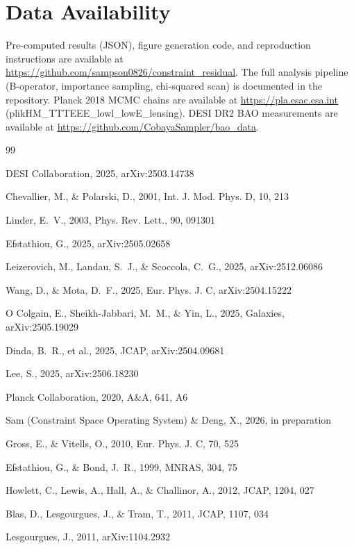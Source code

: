 \documentclass[12pt,preprint]{aastex631}
\begin{document}
\section*{Data Availability}
Pre-computed results (JSON), figure generation code, and reproduction instructions are available at \url{https://github.com/sampson0826/constraint_residual}. The full analysis pipeline (B-operator, importance sampling, chi-squared scan) is documented in the repository. Planck 2018 MCMC chains are available at \url{https://pla.esac.esa.int} (plikHM\_TTTEEE\_lowl\_lowE\_lensing). DESI DR2 BAO measurements are available at \url{https://github.com/CobayaSampler/bao_data}.

\begin{thebibliography}{99}

DESI Collaboration, 2025, arXiv:2503.14738

Chevallier, M., \& Polarski, D., 2001, Int. J. Mod. Phys. D, 10, 213

Linder, E.~V., 2003, Phys. Rev. Lett., 90, 091301

Efstathiou, G., 2025, arXiv:2505.02658

Leizerovich, M., Landau, S.~J., \& Scoccola, C.~G., 2025, arXiv:2512.06086

Wang, D., \& Mota, D.~F., 2025, Eur. Phys. J. C, arXiv:2504.15222

O Colgain, E., Sheikh-Jabbari, M.~M., \& Yin, L., 2025, Galaxies, arXiv:2505.19029

Dinda, B.~R., et al., 2025, JCAP, arXiv:2504.09681

Lee, S., 2025, arXiv:2506.18230

Planck Collaboration, 2020, A\&A, 641, A6

Sam (Constraint Space Operating System) \& Deng, X., 2026, in preparation

Gross, E., \& Vitells, O., 2010, Eur. Phys. J. C, 70, 525

Efstathiou, G., \& Bond, J.~R., 1999, MNRAS, 304, 75

Howlett, C., Lewis, A., Hall, A., \& Challinor, A., 2012, JCAP, 1204, 027

Blas, D., Lesgourgues, J., \& Tram, T., 2011, JCAP, 1107, 034

Lesgourgues, J., 2011, arXiv:1104.2932

\end{thebibliography}
\end{document}
